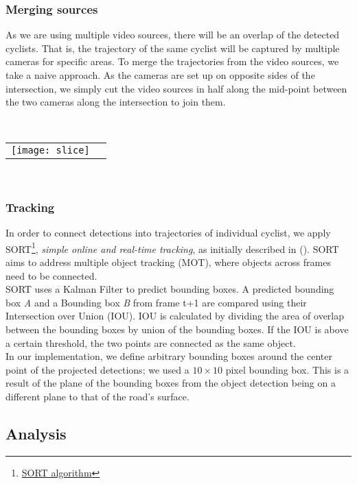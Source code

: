 \subsubsection{Merging sources}
As we are using multiple video sources, there will be an overlap of the detected cyclists. 
That is, the trajectory of the same cyclist will be captured by multiple cameras for specific areas. 
To merge the trajectories from the video sources, we take a naive approach. As the cameras are set up on
opposite sides of the intersection, we simply cut the video sources in half along the mid-point between
the two cameras along the intersection to join them.

\ \\ 
\noindent
\begin{tabular}{@{}cc}
\texttt{[image: slice]} 
\end{tabular}
\label{slice}
\

\subsubsection{Tracking}

In order to connect detections into trajectories of individual cyclist, we apply 
SORT\footnote{\href{https://github.com/abewley/sort}{SORT algorithm}}, \textit{simple online and real-time tracking}, as initially described in (\cite{Bewley2016_sort}). 
SORT aims to address multiple object tracking (MOT), where objects across frames need to be connected. 
\ \\ 

SORT uses a Kalman Filter to predict bounding boxes. A predicted bounding box \textit{A} and a Bounding box \textit{B} from 
frame t+1 are compared using their Intersection over Union (IOU). IOU is calculated by dividing the area of overlap between the 
bounding boxes by union of the bounding boxes. If the IOU is above a certain threshold, the two points are connected as the same object.
\ \\ 

In our implementation, we define arbitrary bounding boxes around the center point of the projected detections; 
we used a $10 \times 10$ pixel bounding box. This is a result of the plane of the bounding boxes from the object detection being on
a different plane to that of the road's surface.

\subsection{Analysis}

